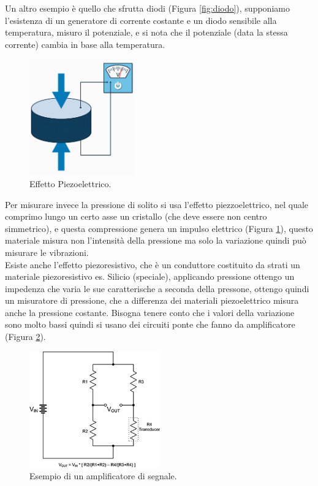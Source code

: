 \documentclass[11pt, twocolumn]{article}
\begin{document}
Un altro esempio è quello che sfrutta diodi (Figura \ref{fig:diodo}), supponiamo l'esistenza di un generatore di corrente costante e un diodo sensibile alla temperatura, misuro il potenziale, e si nota che il potenziale (data la stessa corrente) cambia in base alla temperatura.
\begin{figure}[!h]
  \centering
  \includegraphics[width=\linewidth,height=5cm]{imgs/piezoelettrico.png}
  \caption{Effetto Piezoelettrico.}
  \label{fig:piezoelettrico}
\end{figure}
Per misurare invece la pressione di solito si usa l'effetto piezzoelettrico, nel quale comprimo lungo un certo asse un cristallo (che deve essere non centro simmetrico), e questa compressione genera un impulso elettrico (Figura \ref{fig:piezoelettrico}), questo materiale misura non l'intensità della pressione ma solo la variazione quindi può misurare le vibrazioni.\\
Esiste anche l'effetto piezoresistivo, che è un conduttore costituito da strati un materiale piezoresistivo es. Silicio (speciale), applicando pressione ottengo un impedenza che varia le sue caratterische a seconda della pressone, ottengo quindi un misuratore di pressione, che a differenza dei materiali piezoelettrico misura anche la pressione costante.
Bisogna tenere conto che i valori della variazione sono molto bassi quindi si usano dei circuiti ponte che fanno da amplificatore (Figura \ref{fig:amplifier}).
\begin{figure}[!h]
  \centering
  \includegraphics[width=\linewidth,height=5cm]{imgs/amplifier.jpg}
  \caption{Esempio di un amplificatore di segnale.}
  \label{fig:amplifier}
\end{figure}\\
\end{document}
